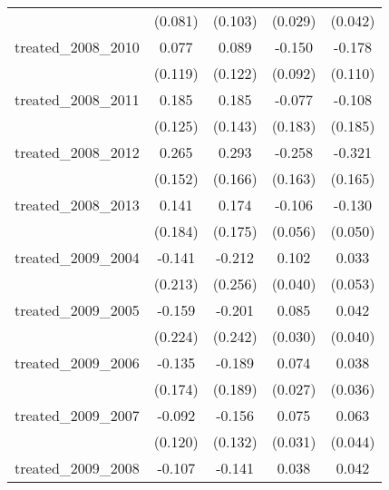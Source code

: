 {\begin{tabular}{l*{4}{c}}
            &     (0.081)         &     (0.103)         &     (0.029)         &     (0.042)         \\
[1em]
treated\_2008\_2010&       0.077         &       0.089         &      -0.150         &      -0.178         \\
            &     (0.119)         &     (0.122)         &     (0.092)         &     (0.110)         \\
[1em]
treated\_2008\_2011&       0.185         &       0.185         &      -0.077         &      -0.108         \\
            &     (0.125)         &     (0.143)         &     (0.183)         &     (0.185)         \\
[1em]
treated\_2008\_2012&       0.265         &       0.293         &      -0.258         &      -0.321         \\
            &     (0.152)         &     (0.166)         &     (0.163)         &     (0.165)         \\
[1em]
treated\_2008\_2013&       0.141         &       0.174         &      -0.106         &      -0.130\sym{**} \\
            &     (0.184)         &     (0.175)         &     (0.056)         &     (0.050)         \\
[1em]
treated\_2009\_2004&      -0.141         &      -0.212         &       0.102\sym{*}  &       0.033         \\
            &     (0.213)         &     (0.256)         &     (0.040)         &     (0.053)         \\
[1em]
treated\_2009\_2005&      -0.159         &      -0.201         &       0.085\sym{**} &       0.042         \\
            &     (0.224)         &     (0.242)         &     (0.030)         &     (0.040)         \\
[1em]
treated\_2009\_2006&      -0.135         &      -0.189         &       0.074\sym{**} &       0.038         \\
            &     (0.174)         &     (0.189)         &     (0.027)         &     (0.036)         \\
[1em]
treated\_2009\_2007&      -0.092         &      -0.156         &       0.075\sym{*}  &       0.063         \\
            &     (0.120)         &     (0.132)         &     (0.031)         &     (0.044)         \\
[1em]
treated\_2009\_2008&      -0.107         &      -0.141         &       0.038         &       0.042         \\

\end{tabular}}
